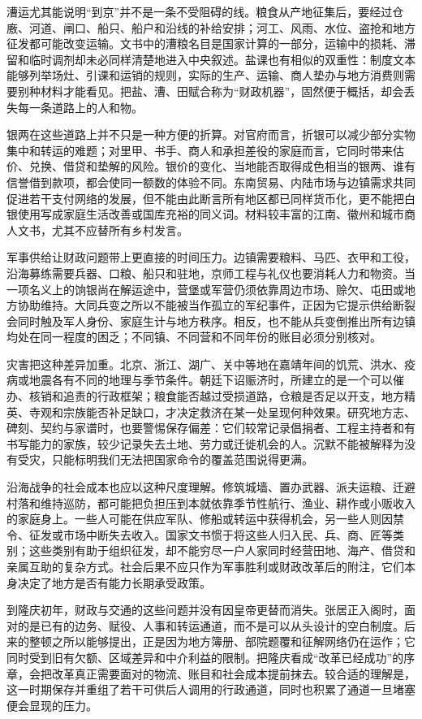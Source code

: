 漕运尤其能说明“到京”并不是一条不受阻碍的线。粮食从产地征集后，要经过仓廒、河道、闸口、船只、船户和沿线的补给安排；河工、风雨、水位、盗抢和地方征发都可能改变运输。文书中的漕粮名目是国家计算的一部分，运输中的损耗、滞留和临时调剂却未必同样清楚地进入中央叙述。盐课也有相似的双重性：制度文本能够列举场灶、引课和运销的规则，实际的生产、运输、商人垫办与地方消费则需要别种材料才能看见。把盐、漕、田赋合称为“财政机器”，固然便于概括，却会丢失每一条道路上的人和物。

银两在这些道路上并不只是一种方便的折算。对官府而言，折银可以减少部分实物集中和转运的难题；对里甲、书手、商人和承担差役的家庭而言，它同时带来估价、兑换、借贷和垫解的风险。银价的变化、当地能否取得成色相当的银两、谁有信誉借到款项，都会使同一额数的体验不同。东南贸易、内陆市场与边镇需求共同促进若干支付网络的发展，但不能由此断言所有地区都已同样货币化，更不能把白银使用写成家庭生活改善或国库充裕的同义词。材料较丰富的江南、徽州和城市商人文书，尤其不应替所有乡村发言。

军事供给让财政问题带上更直接的时间压力。边镇需要粮料、马匹、衣甲和工役，沿海募练需要兵器、口粮、船只和驻地，京师工程与礼仪也要消耗人力和物资。当一项名义上的饷银尚在解运途中，营堡或军营仍须依靠周边市场、赊欠、屯田或地方协助维持。大同兵变之所以不能被当作孤立的军纪事件，正因为它提示供给断裂会同时触及军人身份、家庭生计与地方秩序。相反，也不能从兵变倒推出所有边镇均处在同一程度的困乏；不同镇、不同营和不同年份的账目必须分别核对。

灾害把这种差异加重。北京、浙江、湖广、关中等地在嘉靖年间的饥荒、洪水、疫病或地震各有不同的地理与季节条件。朝廷下诏赈济时，所建立的是一个可以催办、核销和追责的行政框架；粮食能否越过受损道路，仓粮是否足以开支，地方精英、寺观和宗族能否补足缺口，才决定救济在某一处呈现何种效果。研究地方志、碑刻、契约与家谱时，也要警惕保存偏差：它们较常记录倡捐者、工程主持者和有书写能力的家族，较少记录失去土地、劳力或迁徙机会的人。沉默不能被解释为没有受灾，只能标明我们无法把国家命令的覆盖范围说得更满。

沿海战争的社会成本也应以这种尺度理解。修筑城墙、置办武器、派夫运粮、迁避村落和维持巡防，都可能把负担压到本就依靠季节性航行、渔业、耕作或小贩收入的家庭身上。一些人可能在供应军队、修船或转运中获得机会，另一些人则因禁令、征发或市场中断失去收入。国家文书惯于将这些人归入民、兵、商、匠等类别；这些类别有助于组织征发，却不能穷尽一户人家同时经营田地、海产、借贷和亲属互助的复杂方式。社会后果不应只作为军事胜利或财政改革后的附注，它们本身决定了地方是否有能力长期承受政策。

到隆庆初年，财政与交通的这些问题并没有因皇帝更替而消失。张居正入阁时，面对的是已有的边务、赋役、人事和转运通道，而不是可以从头设计的空白制度。后来的整顿之所以能够提出，正是因为地方簿册、部院题覆和征解网络仍在运作；它同时受到旧有欠额、区域差异和中介利益的限制。把隆庆看成“改革已经成功”的序章，会把改革真正需要面对的物流、账目和社会成本提前抹去。较合适的理解是，这一时期保存并重组了若干可供后人调用的行政通道，同时也积累了通道一旦堵塞便会显现的压力。

